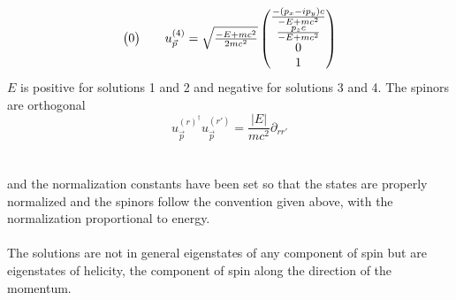 \documentclass{report}
\begin{document}
\begin{equation}
\begin{array}{c@{\qquad}c}
\begin{pmatrix}
			                                                   0
		                                                   \end{pmatrix}
		 &
		u_{\vec{p}}^{(4)} = \sqrt{\frac{-E + mc^2}{2mc^2}} \begin{pmatrix}
			                                                   \frac{-(p_x-ip_y)c}{-E+mc^2} \\
			                                                   \frac{p_z c}{-E+mc^2}        \\
			                                                   0                            \\
			                                                   1
		                                                   \end{pmatrix}
	\end{array}
\end{equation}
$E$ is positive for solutions 1 and 2 and negative for solutions 3 and 4. The spinors are orthogonal
\begin{equation}
	u^{(r)^{\dagger}}_{\vec{p}} u^{(r')}_{\vec{p}} = \frac{\left| E \right| }{mc^2} \partial_{rr'}
\end{equation}
\\
\\
and the normalization constants have been set so that the states are properly normalized and the spinors follow the convention given above, with the normalization proportional to energy.
\\
\\
The solutions are not in general eigenstates of any component of spin but are eigenstates of helicity, the component of spin along the direction of the momentum.
\\
\\
\end{document}
